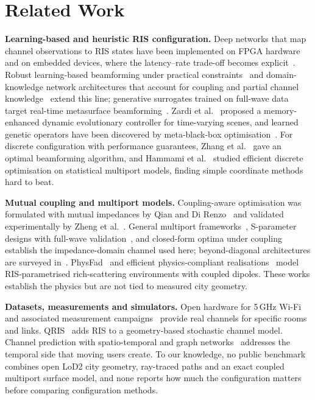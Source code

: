 \documentclass[runningheads]{llncs}
\begin{document}
\section{Related Work}\label{sec:related}
\textbf{Learning-based and heuristic RIS configuration.} Deep networks that map channel observations to RIS states have been implemented on FPGA hardware~\cite{martin2024hardware,padial2026accelerating} and on embedded devices, where the latency--rate trade-off becomes explicit~\cite{urbinati2026ondevice}. Robust learning-based beamforming under practical constraints~\cite{xu2022robust} and domain-knowledge network architectures that account for coupling and partial channel knowledge~\cite{peng2025risnet} extend this line; generative surrogates trained on full-wave data target real-time metasurface beamforming~\cite{liu2026physics}. Zardi et al.~\cite{zardi2024memory} proposed a memory-enhanced dynamic evolutionary controller for time-varying scenes, and learned genetic operators have been discovered by meta-black-box optimisation~\cite{lange2023discovering}. For discrete configuration with performance guarantees, Zhang et al.~\cite{zhang2022configuring} gave an optimal beamforming algorithm, and Hammami et al.~\cite{hammami2026statistical} studied efficient discrete optimisation on statistical multiport models, finding simple coordinate methods hard to beat.

\textbf{Mutual coupling and multiport models.} Coupling-aware optimisation was formulated with mutual impedances by Qian and Di Renzo~\cite{qian2020mutual} and validated experimentally by Zheng et al.~\cite{zheng2024mutual}. General multiport frameworks~\cite{nerini2024universal,nossek2024physically}, S-parameter designs with full-wave validation~\cite{abrardo2024design}, and closed-form optima under coupling~\cite{nerini2026global} establish the impedance-domain channel used here; beyond-diagonal architectures are surveyed in~\cite{li2026tutorial}. PhysFad~\cite{faqiri2023physfad} and efficient physics-compliant realisations~\cite{prodhomme2023efficient} model RIS-parametrised rich-scattering environments with coupled dipoles. These works establish the physics but are not tied to measured city geometry.

\textbf{Datasets, measurements and simulators.} Open hardware for 5\,GHz Wi-Fi~\cite{heinrichs2023open} and associated measurement campaigns~\cite{tewes2023comprehensive,rossanese2024open,piana2026brisc} provide real channels for specific rooms and links. QRIS~\cite{burtakov2023qris} adds RIS to a geometry-based stochastic channel model. Channel prediction with spatio-temporal and graph networks~\cite{liu2022spatio,dayer2025spectral,kumar2025eran,wang2023spatial} addresses the temporal side that moving users create. To our knowledge, no public benchmark combines open LoD2 city geometry, ray-traced paths and an exact coupled multiport surface model, and none reports how much the configuration matters before comparing configuration methods.
\end{document}
